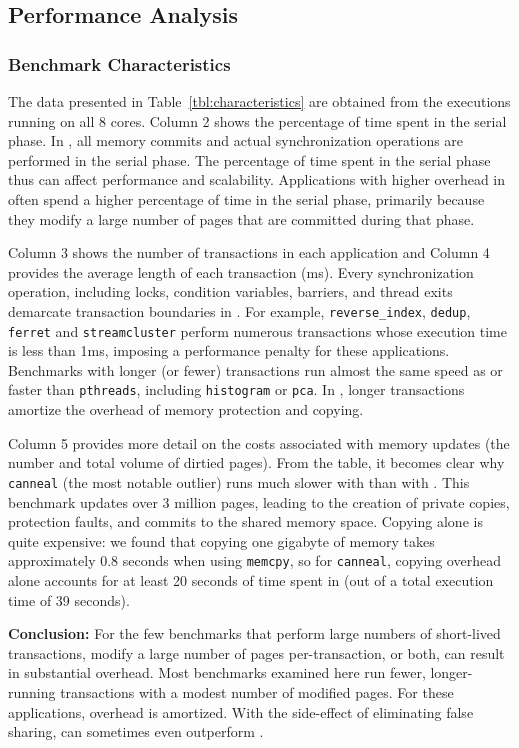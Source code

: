 \subsection{Performance Analysis}

\subsubsection{Benchmark Characteristics}
The data presented in Table~\ref{tbl:characteristics} are obtained
from the executions running on all 8 cores.  Column 2 shows the
percentage of time spent in the serial phase.  In \dthreads{}, all
memory commits and actual synchronization operations are performed in
the serial phase.  The percentage of time spent in the serial phase
thus can affect performance and scalability. Applications with higher
overhead in \dthreads{} often spend a higher percentage of time in the
serial phase, primarily because they modify a large number of pages
that are committed during that phase.

Column 3 shows the number of transactions in each application and
Column 4 provides the average length of each transaction (ms).  Every
synchronization operation, including locks, condition variables,
barriers, and thread exits demarcate transaction boundaries
in \dthreads{}.  For
example, \texttt{reverse\_index}, \texttt{dedup}, \texttt{ferret}
and \texttt{streamcluster} perform numerous transactions whose
execution time is less than 1ms, imposing a performance penalty for
these applications.  Benchmarks with longer (or fewer) transactions run
almost the same speed as or faster than \texttt{pthreads},
including \texttt{histogram} or \texttt{pca}.  In \dthreads{}, longer
transactions amortize the overhead of memory protection and copying.

Column 5 provides more detail on the costs associated with
memory updates (the number and total volume of dirtied pages). From
the table, it becomes clear why \texttt{canneal} (the most notable
outlier) runs much slower with \dthreads{} than with \pthreads{}. This benchmark
updates over 3 million pages, leading to the creation of
private copies, protection faults, and commits to the shared memory
space. Copying alone is quite expensive: we found that copying one
gigabyte of memory takes approximately 0.8 seconds when
using \texttt{memcpy}, so for \texttt{canneal}, copying overhead alone
accounts for at least 20 seconds of time spent in \dthreads{} (out of
a total execution time of 39 seconds).

\textbf{Conclusion: }
For the few benchmarks that perform large numbers of short-lived transactions, modify a large number of pages per-transaction, or both, \dthreads{} can result in substantial overhead.  Most benchmarks examined here run fewer, longer-running transactions with a modest number of modified pages.  For these applications, overhead is amortized.  With the side-effect of eliminating false sharing, \dthreads{} can sometimes even outperform \pthreads{}.

